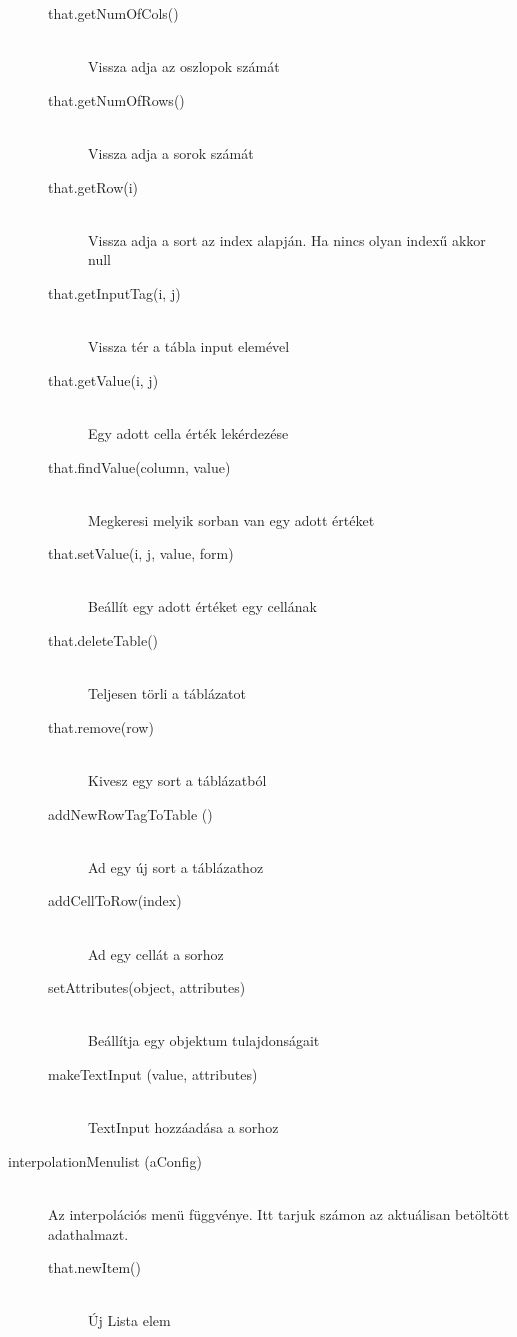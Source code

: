 \begin{description}
\begin{description}
			\item[that.getNumOfCols()] 
			 	\hfill \\ Vissza adja az oszlopok számát
			\item[that.getNumOfRows()]
				\hfill \\ Vissza adja a sorok számát
			\item[that.getRow(i)]
				\hfill \\ Vissza adja a sort az index alapján. 
				Ha nincs olyan indexű akkor null
			\item[that.getInputTag(i, j)]
				\hfill \\ Vissza tér a tábla input elemével
			\item[that.getValue(i, j)]
				\hfill \\ Egy adott cella érték lekérdezése
			\item[that.findValue(column, value)] 
				\hfill \\ Megkeresi melyik sorban van egy adott értéket
			\item[that.setValue(i, j, value, form)]
				\hfill \\ Beállít egy adott értéket egy cellának
			\item[that.deleteTable()]
				\hfill \\ Teljesen törli a táblázatot
			\item[that.remove(row)]
				\hfill \\ Kivesz egy sort a táblázatból
			\item[addNewRowTagToTable ()]
				\hfill \\ Ad egy új sort a táblázathoz
			\item[addCellToRow(index)]
				\hfill \\ Ad  egy cellát a sorhoz
			\item[setAttributes(object, attributes)]
				\hfill \\ Beállítja egy objektum tulajdonságait
			\item[makeTextInput (value,  attributes)]
				\hfill \\  TextInput hozzáadása a sorhoz
			\end{description}
		\item[interpolationMenulist (aConfig)] 
			\hfill \\ 
			Az interpolációs menü függvénye. Itt tarjuk számon az aktuálisan betöltött adathalmazt.
			\begin{description}
			\item[that.newItem()] 
			\hfill \\ Új Lista elem

\end{description}
\end{description}
